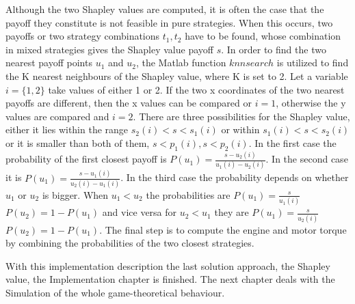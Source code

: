 Although the two Shapley values are computed, it is often the case that the payoff they constitute is not feasible in pure strategies. When this occurs, two payoffs or two strategy combinations $t_1, t_2$ have to be found, whose combination in mixed strategies gives the Shapley value payoff $s$. In order to find the two nearest payoff points $u_1$ and $u_2$, the Matlab function $knnsearch$ is utilized to find the K nearest neighbours of the Shapley value, where K is set to 2. Let a variable $i=\{1,2\}$ take values of either 1 or 2. If the two x coordinates of the two nearest payoffs are different, then the x values can be compared or $i=1$, otherwise the y values are compared and $i=2$. There are three possibilities for the Shapley value, either it lies within the range $s_2(i) < s < s_1(i)$ or within $s_1(i) < s < s_2(i)$ or it is smaller than both of them, $s < p_1(i), s < p_2(i)$. In the first case the probability of the first closest payoff is $P(u_1) = \frac{s - u_2(i)}{u_1(i)-u_2(i)}$. In the second case it is $P(u_1) = \frac{s - u_1(i)}{u_2(i)-u_1(i)}$. In the third case the probability depends on whether $u_1$ or $u_2$ is bigger. When $u_1 < u_2$ the probabilities are $P(u_1) = \frac{s}{u_1(i)}$ $P(u_2) = 1 - P(u_1)$ and vice versa for $u_2 < u_1$ they are $P(u_1) = \frac{s}{u_2(i)}$ $P(u_2) = 1 - P(u_1)$. The final step is to compute the engine and motor torque by combining the probabilities of the two closest strategies.

With this implementation description the last solution approach, the Shapley value, the Implementation chapter is finished. The next chapter deals with the Simulation of the whole game-theoretical behaviour.